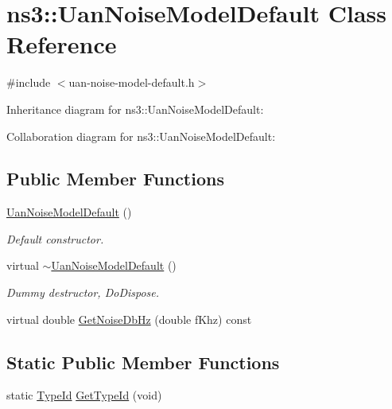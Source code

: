 \hypertarget{classns3_1_1UanNoiseModelDefault}{}\section{ns3\+:\+:Uan\+Noise\+Model\+Default Class Reference}
\label{classns3_1_1UanNoiseModelDefault}


{\ttfamily \#include $<$uan-\/noise-\/model-\/default.\+h$>$}



Inheritance diagram for ns3\+:\+:Uan\+Noise\+Model\+Default\+:


Collaboration diagram for ns3\+:\+:Uan\+Noise\+Model\+Default\+:
\subsection*{Public Member Functions}
\begin{DoxyCompactItemize}
\item 
\hyperlink{classns3_1_1UanNoiseModelDefault_ac765161d5c8abf93e49b9c1de0b9d763}{Uan\+Noise\+Model\+Default} ()
\begin{DoxyCompactList}\small\item\em Default constructor. \end{DoxyCompactList}\item 
virtual \hyperlink{classns3_1_1UanNoiseModelDefault_ada3a071c1f138aba0fe7c5d69c82d029}{$\sim$\+Uan\+Noise\+Model\+Default} ()
\begin{DoxyCompactList}\small\item\em Dummy destructor, Do\+Dispose. \end{DoxyCompactList}\item 
virtual double \hyperlink{classns3_1_1UanNoiseModelDefault_adc7452d70c5ae5b94ad0dd0f1aa2a3f7}{Get\+Noise\+Db\+Hz} (double f\+Khz) const 
\end{DoxyCompactItemize}
\subsection*{Static Public Member Functions}
\begin{DoxyCompactItemize}
\item 
static \hyperlink{classns3_1_1TypeId}{Type\+Id} \hyperlink{classns3_1_1UanNoiseModelDefault_a2223a4d92ae118cab1a70f2b88ffd420}{Get\+Type\+Id} (void)
\end{DoxyCompactItemize}
